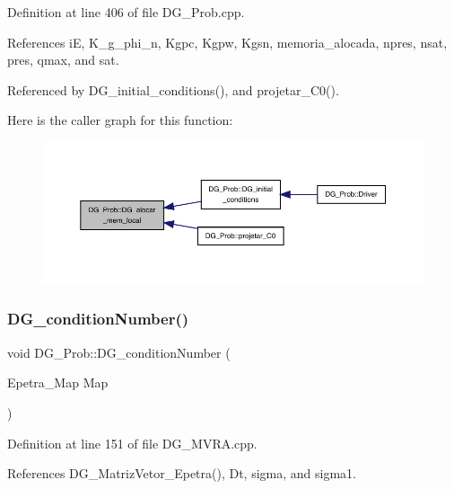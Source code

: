Definition at line 406 of file D\+G\+\_\+\+Prob.\+cpp.



References iE, K\+\_\+g\+\_\+phi\+\_\+n, Kgpc, Kgpw, Kgsn, memoria\+\_\+alocada, npres, nsat, pres, qmax, and sat.



Referenced by D\+G\+\_\+initial\+\_\+conditions(), and projetar\+\_\+\+C0().

Here is the caller graph for this function\+:
\nopagebreak
\begin{figure}[H]
\begin{center}
\leavevmode
\includegraphics[width=350pt]{classDG__Prob_a646bbb0fd2786395486c09b1aa6b2653_icgraph}
\end{center}
\end{figure}
\mbox{\label{classDG__Prob_acb4b2ec3201e22d62bcf50b947b10dc5}} 
\subsubsection{\texorpdfstring{D\+G\+\_\+condition\+Number()}{DG\_conditionNumber()}}
{\footnotesize\ttfamily void D\+G\+\_\+\+Prob\+::\+D\+G\+\_\+condition\+Number (\begin{DoxyParamCaption}\item[{Epetra\+\_\+\+Map}]{Map }\end{DoxyParamCaption})}



Definition at line 151 of file D\+G\+\_\+\+M\+V\+R\+A.\+cpp.



References D\+G\+\_\+\+Matriz\+Vetor\+\_\+\+Epetra(), Dt, sigma, and sigma1.

